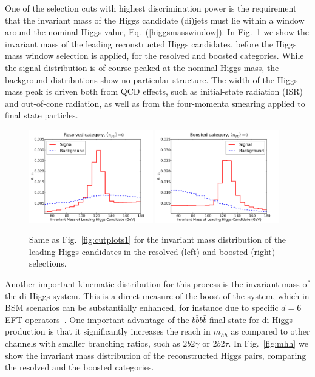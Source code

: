 One of the selection cuts with highest discrimination power is the requirement
that the invariant mass of the Higgs candidate (di)jets must lie within a window
around the nominal Higgs value, Eq.~(\ref{higgsmasswindow}).
%
In Fig.~\ref{fig:mHHinv} we show the invariant mass
of the leading reconstructed Higgs candidates, before the Higgs mass window
selection
  is applied, for the resolved and boosted categories.
%
While the signal distribution is of course peaked at the
nominal Higgs mass, the background distributions
show no particular
structure.
%
The
width of the Higgs mass peak is driven both from QCD effects,
such as initial-state radiation (ISR)
and out-of-cone radiation, as well
as from the four-momenta smearing applied to final state particles.
%

\begin{figure}[t]
\begin{center}
  \includegraphics[width=0.48\textwidth]{plots/m_H0_res_C1d_noPU.pdf}
  \includegraphics[width=0.48\textwidth]{plots/m_H0_bst_C1d_noPU.pdf}
  \caption{\small Same as   Fig.~\ref{fig:cutplots1} for the invariant
    mass distribution of the leading Higgs candidates in the resolved
    (left) and boosted (right) selections.
}
\label{fig:mHHinv}
\end{center}
\end{figure}


Another important kinematic distribution for
this process is the invariant mass
of the di-Higgs system.
%
This is a direct measure of the boost of the system,
which in  BSM scenarios can be substantially
enhanced, for instance due to
specific $d=6$ EFT operators~\cite{Azatov:2015oxa}.
%
One important advantage of the $b\bar{b}b\bar{b}$ final state for
di-Higgs production is that it significantly increases the reach
in $m_{hh}$ as compared to other channels with smaller branching
ratios,
such as $2b2\gamma$ or $2b2\tau$.
%
In Fig.~\ref{fig:mhh} we show the invariant mass distribution of the
reconstructed Higgs pairs,
comparing the resolved and the boosted categories.

